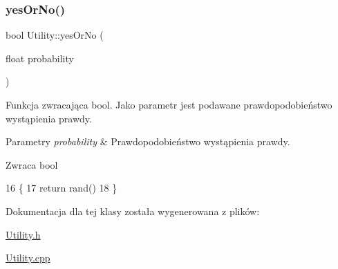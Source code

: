 \subsubsection{\texorpdfstring{yes\+Or\+No()}{yesOrNo()}}
{\footnotesize\ttfamily bool Utility\+::yes\+Or\+No (\begin{DoxyParamCaption}\item[{float}]{probability }\end{DoxyParamCaption})}

Funkcja zwracająca bool. Jako parametr jest podawane prawdopodobieństwo wystąpienia prawdy. 
\begin{DoxyParams}{Parametry}
{\em probability} & Prawdopodobieństwo wystąpienia prawdy. \\
\hline
\end{DoxyParams}
\begin{DoxyReturn}{Zwraca}
bool 
\end{DoxyReturn}

\begin{DoxyCode}
16 \{
17     \textcolor{keywordflow}{return} rand() %
18 \}
\end{DoxyCode}


Dokumentacja dla tej klasy została wygenerowana z plików\+:\begin{DoxyCompactItemize}
\item 
\mbox{\hyperlink{_utility_8h}{Utility.\+h}}\item 
\mbox{\hyperlink{_utility_8cpp}{Utility.\+cpp}}\end{DoxyCompactItemize}

